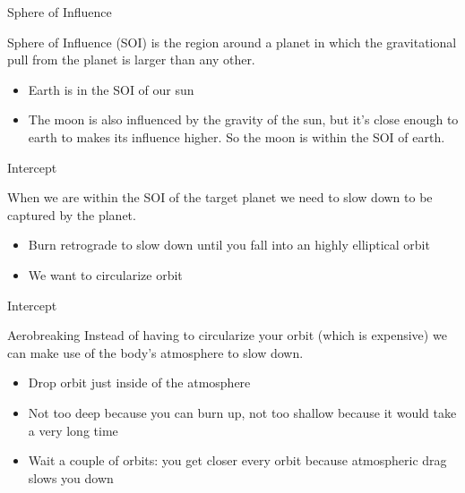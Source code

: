 {
%
\begin{frame}
\end{frame}
\begin{frame}[t]{Sphere of Influence}
    \begin{block}{}
    Sphere of Influence (SOI) is the region around a planet in which the gravitational pull from the planet is larger
    than any other.
    \begin{itemize}
        \item Earth is in the SOI of our sun
        \item The moon is also influenced by the gravity of the sun, but it's close enough to earth to makes its
            influence higher. So the moon is within the SOI of earth.
    \end{itemize}
    \end{block}
\end{frame}
\begin{frame}[t]{Intercept}
    \begin{block}{}
        When we are within the SOI of the target planet we need to slow down to be captured by the planet.
        \begin{itemize}
            \item Burn retrograde to slow down until you fall into an highly elliptical orbit
            \item We want to circularize orbit
        \end{itemize}
    \end{block}
\end{frame}
\begin{frame}[t]{Intercept}
    \begin{block}{Aerobreaking}
        Instead of having to circularize your orbit (which is expensive) we can make use of the body's atmosphere to
        slow down.
        \begin{itemize}
            \item Drop orbit just inside of the atmosphere
            \item Not too deep because you can burn up, not too shallow because it would take a very long time
            \item Wait a couple of orbits: you get closer every orbit because atmospheric drag slows you down
        \end{itemize}
    \end{block}
\end{frame}
}
